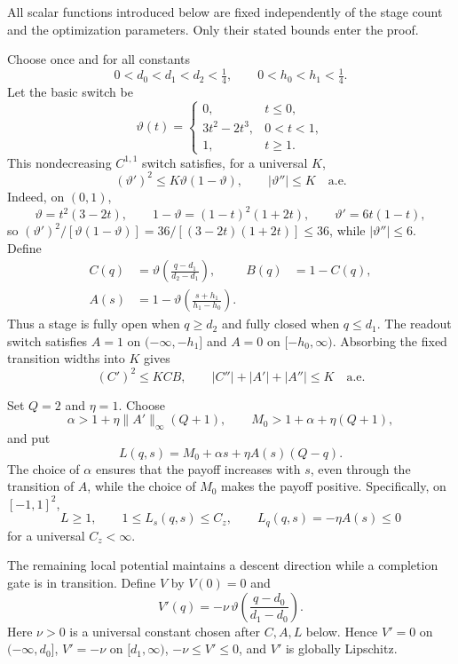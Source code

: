 \documentclass[11pt]{article}
\theoremstyle{definition}
\theoremstyle{remark}
\begin{document}
All scalar functions introduced below are fixed independently of the stage
count and the optimization parameters. Only their stated bounds enter the
proof.

Choose once and for all constants
\[
 0<d_0<d_1<d_2<\tfrac14,
 \qquad 0<h_0<h_1<\tfrac14.
\]
Let the basic switch be
\[
 \vartheta(t)=
 \begin{cases}
 0,&t\le0,\\
 3t^2-2t^3,&0<t<1,\\
 1,&t\ge1.
 \end{cases}
\]
This nondecreasing $C^{1,1}$ switch satisfies, for a universal $K$,
\begin{equation}\label{eq:switch-energy}
 (\vartheta')^2\le K\vartheta(1-\vartheta),
 \qquad |\vartheta''|\le K\quad\text{a.e.}
\end{equation}
Indeed, on $(0,1)$,
\[
 \vartheta=t^2(3-2t),\qquad
 1-\vartheta=(1-t)^2(1+2t),\qquad
 \vartheta'=6t(1-t),
\]
so $(\vartheta')^2/[\vartheta(1-\vartheta)]
=36/[(3-2t)(1+2t)]\le36$, while $|\vartheta''|\le6$.
Define
\begin{align}
 C(q)&=\vartheta\!\left(\frac{q-d_1}{d_2-d_1}\right),
 &B(q)&=1-C(q),\label{eq:C-gate}\\
 A(s)&=1-\vartheta\!\left(\frac{s+h_1}{h_1-h_0}\right).
 \label{eq:A-gate}
\end{align}
Thus a stage is fully open when $q\ge d_2$ and fully closed when
$q\le d_1$. The readout switch satisfies $A=1$ on
$(-\infty,-h_1]$ and $A=0$ on $[-h_0,\infty)$. Absorbing the fixed
transition widths into $K$ gives
\begin{equation}\label{eq:C-energy}
 (C')^2\le KCB,
 \qquad |C''|+|A'|+|A''|\le K\quad\text{a.e.}
\end{equation}

Set $Q=2$ and $\eta=1$.  Choose
\[
 \alpha>1+\eta\|A'\|_\infty(Q+1),
 \qquad
 M_0>1+\alpha+\eta(Q+1),
\]
and put
\begin{equation}\label{eq:L-def}
 L(q,s)=M_0+\alpha s+\eta A(s)(Q-q).
\end{equation}
The choice of $\alpha$ ensures that the payoff increases with $s$, even
through the transition of $A$, while the choice of $M_0$ makes the payoff
positive. Specifically, on $[-1,1]^2$,
\begin{equation}\label{eq:L-properties}
 L\ge1,
 \qquad 1\le L_s(q,s)\le C_z,
 \qquad L_q(q,s)=-\eta A(s)\le0
\end{equation}
for a universal $C_z<\infty$.

The remaining local potential maintains a descent direction while a
completion gate is in transition. Define $V$ by $V(0)=0$ and
\begin{equation}\label{eq:V-properties}
 V'(q)=-\nu\,
 \vartheta\!\left(\frac{q-d_0}{d_1-d_0}\right).
\end{equation}
Here $\nu>0$ is a universal constant chosen after $C,A,L$ below.
Hence $V'=0$ on $(-\infty,d_0]$, $V'=-\nu$ on
$[d_1,\infty)$, $-\nu\le V'\le0$, and $V'$ is globally Lipschitz.
\end{document}
